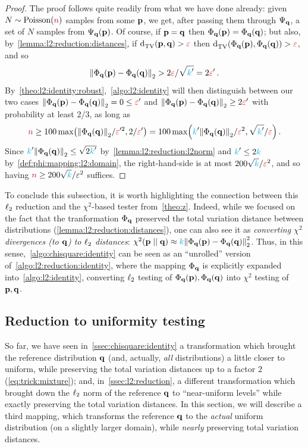 \begin{proof}
The proof follows quite readily from what we have done already: given $N\sim \poisson{\ns}$ \iid samples from some $\p$, we get, after passing them through $\Psi_\q$, a set of $N$ \iid samples from $\Psi_\q(\p)$. Of course, if $\p=\q$ then $\Phi_\q(\p)=\Phi_\q(\q)$; but also, by~\cref{lemma:l2:reduction:distances}, if $\totalvardist{\p}{\q}>\dst$ then $\totalvardist{\Phi_\q(\p)}{\Phi_\q(\q)}>\dst$, and so 
\[
	\normtwo{\Phi_\q(\p) - \Phi_\q(\q) } > 2\dst/\sqrt{\ab'} = 2\dst'\,.
\]
By~\cref{theo:l2:identity:robust},~\cref{algo:l2:identity} will then distinguish between our two cases $\normtwo{\Phi_\q(\p) - \Phi_\q(\q) } = 0 \leq \dst'$ and $\normtwo{\Phi_\q(\p) - \Phi_\q(\q) } \geq 2\dst'$ with probability at least $2/3$, as long as 
\[
	\ns \geq 100\max\Paren{\normtwo{\Phi_\q(\q)}/\dst'^2, 2/\dst'} = 100\max\Paren{\ab'\normtwo{\Phi_\q(\q)}/\dst^2, \sqrt{\ab'}/\dst}\,.
\]
Since $\ab'\normtwo{\Phi_\q(\q)} \leq \sqrt{2\ab'}$ by~\cref{lemma:l2:reduction:l2norm} and $\ab'\leq 2\ab$ by~\cref{def:phi:mapping:l2:domain}, the right-hand-side is at most $200\sqrt{\ab}/\dst^2$, and so having $\ns \geq 200\sqrt{\ab}/\eps^2$ suffices.
\end{proof}
To conclude this subsection, it is worth highlighting the connection between this $\lp[2]$ reduction and the $\chi^2$-based tester from~\cref{theo:z}. Indeed, while we focused on the fact that the tranformation $\Phi_\q$ preserved the total variation distance between distributions (\cref{lemma:l2:reduction:distances}), one can also see it as \emph{converting $\chi^2$ divergences (to $\q$) to $\lp[2]$ distances}: $\chisquare{\p}{\q}\approx \ab\normtwo{\Phi_\q(\p)-\Phi_\q(\q)}^2$. Thus, in this sense,~\cref{algo:chisquare:identity} can be seen as an ``unrolled'' version of~\cref{algo:l2:reduction:identity}, where the mapping $\Phi_\q$ is explicitly expanded into~\cref{algo:l2:identity}, converting $\lp[2]$ testing of $\Phi_\q(\p),\Phi_\q(\q)$ into $\chi^2$ testing of $\p,\q$.

\subsection{Reduction to uniformity testing}
	\label{ssec:l1:reduction}
So far, we have seen in~\cref{ssec:chisquare:identity} a transformation which brought the reference distribution $\q$ (and, actually, \emph{all} distributions) a little closer to uniform, while preserving the total variation distances up to a factor $2$ (\cref{eq:trick:mixture}); and, in~\cref{ssec:l2:reduction}, a different transformation which brought down the $\lp[2]$ norm of the reference $\q$ to ``near-uniform levels'' while exactly preserving the total variation distances. In this section, we will describe a third mapping, which transforms the reference $\q$ to the \emph{actual} uniform distribution (on a slightly larger domain), while \emph{nearly} preserving total variation distances.

